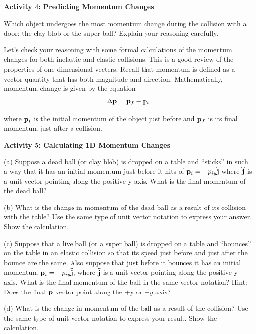 \newpage

\textbf{Activity 4: Predicting Momentum Changes }

Which object undergoes the most momentum change during the collision with a
door: the clay blob or the super ball? Explain your reasoning carefully.
\vspace{20mm}

Let's check your reasoning with some formal calculations of the momentum changes
for both inelastic and elastic collisions. This is a good review of the properties
of one-dimensional vectors. Recall that momentum is defined as a vector quantity
that has both magnitude and direction. Mathematically, momentum change is given
by the equation
\[
\Delta {\bf p}={{\bf p}_{f}}-{{\bf p}_{i}}\]


where \( {{\bf p}_{i}} \) is the initial momentum of the object just
before and \( {{\bf p}_{f}} \) is its final momentum just after a
collision.

\textbf{Activity 5: Calculating 1D Momentum Changes} 

(a) Suppose a dead ball (or clay blob) is dropped on a table and ``sticks''
in such a way that it has an initial momentum just before it hits of 
\( {{\bf p}_{i}}=-p_{iy}\widehat{\bf j} \)
where \( \widehat{\bf j} \) is a unit vector pointing along the positive y axis.
What is the final momentum of the dead ball?
\vspace{15mm}

(b) What is the change in momentum of the dead ball as a result of its collision
with the table? Use the same type of unit vector notation to express your 
answer. Show the calculation.
\vspace{20mm}

(c) Suppose that a live ball (or a super ball) is dropped on a table and ``bounces''
on the table in an elastic collision so that its speed just before and just
after the bounce are the same. Also suppose that just before it bounces it has
an initial momentum \( {{\bf p}_{i}}=-p_{iy}\widehat{\bf j} \),
where \( \widehat{\bf j} \)
is a unit vector pointing along the positive y-axis. What is the final momentum
of the ball in the same vector notation? Hint: Does the final 
\( {\bf p} \)
vector point along the $+$y or $-y$ axis? 
\vspace{15mm}

(d) What is the change in momentum of the ball as a result of the collision?
Use the same type of unit vector notation to express your result. Show the 
calculation.
\vspace{20mm}

